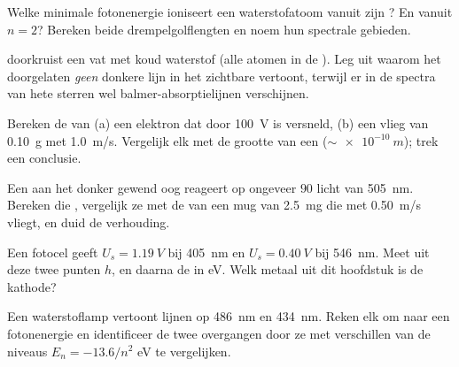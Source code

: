 \begin{exercise}[$\star\star$]\label{exo:g12:quantum-world:8}
Welke minimale fotonenergie ioniseert een waterstofatoom vanuit zijn
? En vanuit $n = 2$? Bereken beide drempelgolflengten en noem hun
spectrale gebieden.
\end{exercise}

\begin{exercise}[$\star\star$]\label{exo:g12:quantum-world:9}
 doorkruist een vat met koud waterstof (alle atomen in de
). Leg uit waarom het doorgelaten  \emph{geen} donkere
lijn in het zichtbare vertoont, terwijl er in de spectra van hete sterren wel
balmer-absorptielijnen verschijnen.
\end{exercise}

\begin{exercise}[$\star\star$]\label{exo:g12:quantum-world:10}
Bereken de  van (a) een elektron dat door \qty{100}{V} is
versneld, (b) een vlieg van \qty{0.10}{g} met \qty{1.0}{m/s}. Vergelijk elk
met de grootte van een  ($\sim \qty{e-10}{m}$); trek een conclusie.
\end{exercise}

\begin{exercise}[$\star\star$]\label{exo:g12:quantum-world:11}
Een aan het donker gewend oog reageert op ongeveer $90$  licht van
\qty{505}{nm}. Bereken die , vergelijk ze met de  van
een mug van \qty{2.5}{mg} die met \qty{0.50}{m/s} vliegt, en duid de
verhouding.
\end{exercise}

\begin{exercise}[$\star\star\star$]\label{exo:g12:quantum-world:12}
Een fotocel geeft $U_s = \qty{1.19}{V}$ bij \qty{405}{nm} en
$U_s = \qty{0.40}{V}$ bij \qty{546}{nm}. Meet uit deze twee punten $h$, en
daarna de  in \unit{eV}. Welk metaal uit dit hoofdstuk is de
kathode?
\end{exercise}

\begin{exercise}[$\star\star\star$]\label{exo:g12:quantum-world:13}
Een waterstoflamp vertoont lijnen op \qty{486}{nm} en \qty{434}{nm}. Reken elk
om naar een fotonenergie en identificeer de twee overgangen door ze met
verschillen van de niveaus $E_n = -13.6/n^2$ \unit{eV} te vergelijken.
\end{exercise}

